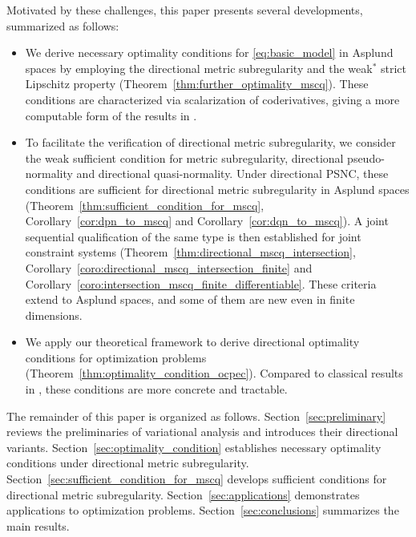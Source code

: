 \documentclass[12pt,twoside,reqno]{amsart}
\theoremstyle{definition}
\numberwithin{equation}{section}
\begin{document}
Motivated by these challenges, this paper presents several developments, summarized as follows:
\begin{itemize}
    \item We derive necessary optimality conditions for \eqref{eq:basic_model} in Asplund spaces by employing the directional metric subregularity and the weak\(^*\) strict Lipschitz property (Theorem~\ref{thm:further_optimality_mscq}). These conditions are characterized via scalarization of coderivatives, giving a more computable form of the results in \cite{gfrerer2013directional}. 
    \item To facilitate the verification of directional metric subregularity, we consider the weak sufficient condition for metric subregularity, directional pseudo-normality and directional quasi-normality. Under directional PSNC, these conditions are sufficient for directional metric subregularity in Asplund spaces (Theorem~\ref{thm:sufficient_condition_for_mscq}, Corollary~\ref{cor:dpn_to_mscq} and  Corollary~\ref{cor:dqn_to_mscq}). A joint sequential qualification of the same type is then established for joint constraint systems (Theorem~\ref{thm:directional_mscq_intersection}, Corollary~\ref{coro:directional_mscq_intersection_finite} and Corollary~\ref{coro:intersection_mscq_finite_differentiable}. These criteria extend \cite{bai2019directional,gfrerer2017new} to Asplund spaces, and some of them are new even in finite dimensions.
    \item We apply our theoretical framework to derive directional optimality conditions for optimization problems (Theorem~\ref{thm:optimality_condition_ocpec}). Compared to classical results in \cite{gfrerer2014metric,long2017calculusb}, these conditions are more concrete and tractable. 
\end{itemize}

The remainder of this paper is organized as follows. Section~\ref{sec:preliminary} reviews the preliminaries of variational analysis and introduces their directional variants. Section~\ref{sec:optimality_condition} establishes necessary optimality conditions under directional metric subregularity. Section~\ref{sec:sufficient_condition_for_mscq} develops sufficient conditions for directional metric subregularity. Section~\ref{sec:applications} demonstrates applications to optimization problems. Section~\ref{sec:conclusions} summarizes the main results.
\end{document}
